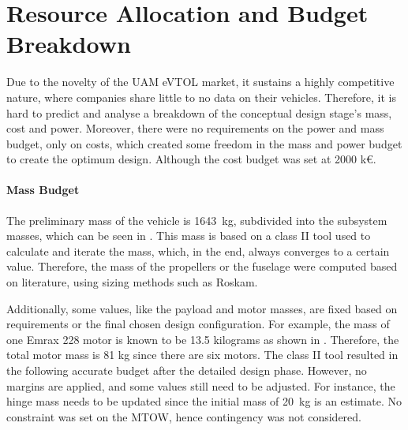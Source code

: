 \chapter{Resource Allocation and Budget Breakdown}
\label{ch:Resource_Allocation_and_Budget_Breakdown}
Due to the novelty of the UAM eVTOL market, it sustains a highly competitive nature, where companies share little to no data on their vehicles.
Therefore, it is hard to predict and analyse a breakdown of the conceptual design stage’s mass, cost and power.
Moreover, there were no requirements on the power and mass budget, only on costs, which created some freedom in the mass and power budget to create the optimum design.
Although the cost budget was set at 2000 k€.

\subsubsection{Mass Budget}
The preliminary mass of the vehicle is \qty{1643}{kg}, subdivided into the subsystem masses, which can be seen in .
This mass is based on a class II tool used to calculate and iterate the mass, which, in the end, always converges to a certain value. Therefore, the mass of the propellers or the fuselage were computed based on literature, using sizing methods such as Roskam\cite{Roskam_Part_2}.

Additionally, some values, like the payload and motor masses,
are fixed based on requirements or the final chosen design configuration.
For example, the mass of one Emrax 228 motor is known to be 13.5 kilograms as shown in .
Therefore, the total motor mass is 81 kg since there are six motors.
The class II tool resulted in the following accurate budget after the detailed design phase.
However, no margins are applied, and some values still need to be adjusted.
For instance, the hinge mass needs to be updated since the initial mass of \qty{20}{kg} is an estimate.
No constraint was set on the MTOW, hence contingency was not considered.

